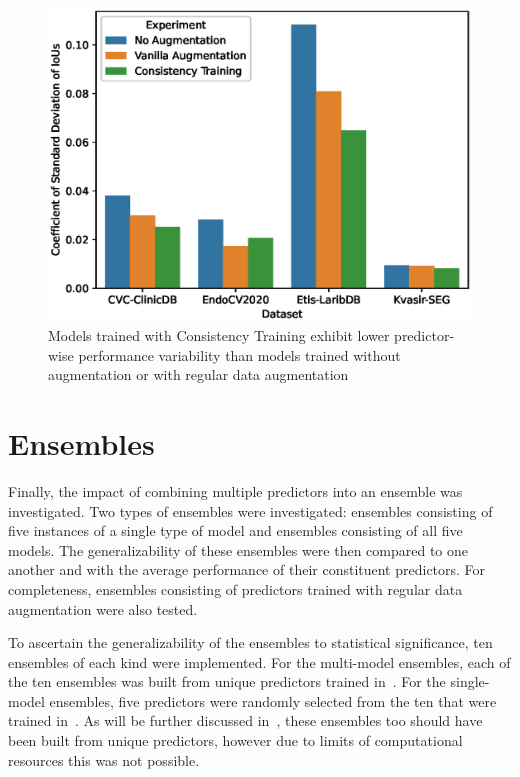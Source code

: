 \begin{figure}[htb]
    \centering
    \includegraphics[width=\linewidth]{illustrations/consistency_training_cstd.eps}
    \caption[Consistency Training performance variability]{Models trained with Consistency Training exhibit lower predictor-wise performance variability than models trained without augmentation or with regular data augmentation}
    \label{fig:consistency_cstd}
\end{figure}

\section{Ensembles}\label{ensembles}

Finally, the impact of combining multiple predictors into an ensemble was investigated. Two types of ensembles were investigated: ensembles consisting of five instances of a single type of model and ensembles consisting of all five models. The generalizability of these ensembles were then compared to one another and with the average performance of their constituent predictors. For completeness, ensembles consisting of predictors trained with regular data augmentation were also tested.   

To ascertain the generalizability of the ensembles to statistical significance, ten ensembles of each kind were implemented. For the multi-model ensembles, each of the ten ensembles was built from unique predictors trained in~.  For the single-model ensembles, five predictors were randomly selected from the ten that were trained in~. As will be further discussed in~, these ensembles too should have been built from unique predictors, however due to limits of computational resources this was not possible. 

